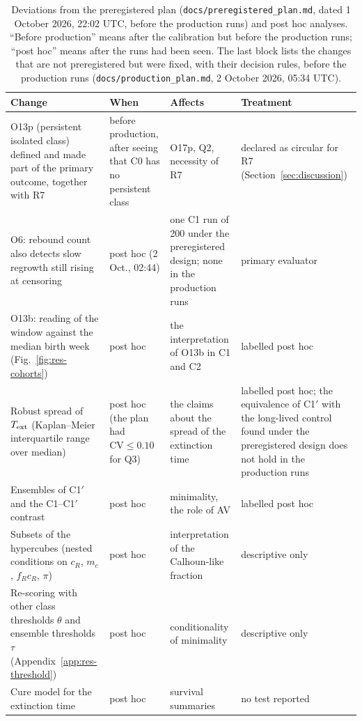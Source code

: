 \begin{table}[ht]
\centering
\caption{Deviations from the preregistered plan (\texttt{docs/preregistered\_plan.md}, dated 1 October 2026, 22:02 UTC,
before the production runs) and post hoc
analyses. ``Before production'' means after the calibration but before the production runs; ``post hoc'' means
after the runs had been seen. The last block lists the changes that are not preregistered but were fixed, with their decision rules, before
the production runs (\texttt{docs/production\_plan.md}, 2 October 2026, 05:34 UTC).}
\label{tab:deviations}
\scriptsize
\setlength{\tabcolsep}{3pt}
\begin{tabular}{@{}p{4.9cm}p{2.6cm}p{4.3cm}p{3.7cm}@{}}
\toprule
Change & When & Affects & Treatment \\
\midrule
O13p (persistent isolated class) defined and made part of the primary outcome, together with R7 & before
production, after seeing that \textsf{C0} has no persistent class & O17p, Q2, necessity of R7 & declared as
circular for R7 (Section~\ref{sec:discussion}) \\
O6: rebound count also detects slow regrowth still rising at censoring & post hoc (2 Oct., 02:44) & one
\textsf{C1} run of 200 under the preregistered design; none in the production runs & primary evaluator \\
O13b: reading of the window against the median birth week (Fig.~\ref{fig:res-cohorts}) & post hoc & the
interpretation of O13b in \textsf{C1} and \textsf{C2} & labelled post hoc \\
Robust spread of $T_{\rm ext}$ (Kaplan--Meier interquartile range over median) & post hoc (the plan
had $\mathrm{CV}\le0.10$ for Q3) & the claims about the spread of the extinction time & labelled post hoc; the
equivalence of \textsf{C1}$'$ with the long-lived control found under the preregistered design does not hold in the production runs \\
Ensembles of \textsf{C1}$'$ and the \textsf{C1}--\textsf{C1}$'$ contrast & post hoc & minimality, the role of
AV & labelled post hoc \\
Subsets of the hypercubes (nested conditions on $c_R$, $m_c$, $f_Rc_R$, $\pi$) & post hoc & interpretation of the
Calhoun-like fraction & descriptive only \\
Re-scoring with other class thresholds $\theta$ and ensemble thresholds $\tau$ (Appendix~\ref{app:res-threshold}) &
post hoc & conditionality of minimality & descriptive only \\
Cure model for the extinction time & post hoc & survival summaries & no test reported \\

\end{tabular}
\end{table}
